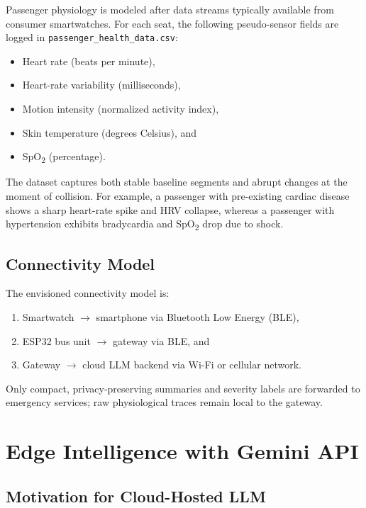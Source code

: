 \documentclass[conference]{IEEEtran}
\begin{document}
Passenger physiology is modeled after data streams typically available from consumer smartwatches.
For each seat, the following pseudo-sensor fields are logged in \texttt{passenger\_health\_data.csv}:

\begin{itemize}
    \item Heart rate (beats per minute),
    \item Heart-rate variability (milliseconds),
    \item Motion intensity (normalized activity index),
    \item Skin temperature (degrees Celsius), and
    \item SpO\textsubscript{2} (percentage).
\end{itemize}

The dataset captures both stable baseline segments and abrupt changes at the moment of collision.
For example, a passenger with pre-existing cardiac disease shows a sharp heart-rate spike and HRV collapse, whereas a passenger with hypertension exhibits bradycardia and SpO\textsubscript{2} drop due to shock.

\subsection{Connectivity Model}

The envisioned connectivity model is:

\begin{enumerate}
    \item Smartwatch $\rightarrow$ smartphone via Bluetooth Low Energy (BLE),
    \item ESP32 bus unit $\rightarrow$ gateway via BLE, and
    \item Gateway $\rightarrow$ cloud LLM backend via Wi-Fi or cellular network.
\end{enumerate}

Only compact, privacy-preserving summaries and severity labels are forwarded to emergency services; raw physiological traces remain local to the gateway.

\section{Edge Intelligence with Gemini API}

\subsection{Motivation for Cloud-Hosted LLM}
\end{document}
